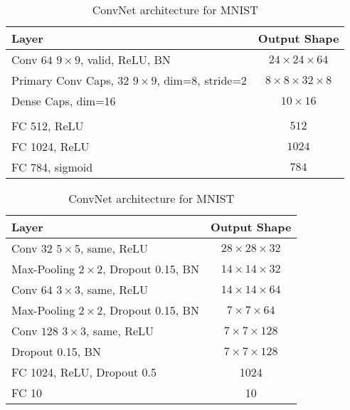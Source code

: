 \begin{table}
	\centering
	
	\begin{tabular}{lc}
		\toprule 
		Layer	&  Output Shape \\ 
		\midrule 
		Conv $64$ $9\times9$, valid, ReLU, BN & $24\times24\times64$ \\ 
		\midrule 
		Primary Conv Caps, $32$ $9\times9$, dim=$8$, stride=2	&  $8\times8\times32\times8$ \\ 
		\midrule 
		Dense Caps, dim=16	& $10\times16$ \\ 
		\midrule 
		& \\
		\midrule
		FC 512, ReLU	& $512$ \\
		\midrule
		FC 1024, ReLU	& $1024$ \\
		\midrule
		FC 784, sigmoid	& $784$ \\
		\bottomrule
	\end{tabular} 
	\caption{CapsNet architecture for MNIST}
	\label{tab:capsnet:mnist}

	\vspace{0.75cm}
	
	\begin{tabular}{lc}
		\toprule 
		Layer	&  Output Shape \\ 
		\midrule 
		Conv $32$ $5\times5$, same,	ReLU & $28\times28\times32$ \\ 
		\midrule 
		Max-Pooling $2\times2$, Dropout 0.15, BN	&  $14\times14\times32$ \\ 
		\midrule 
		Conv $64$ $3\times3$, same, ReLU	& $14\times14\times64$ \\ 
		\midrule 
		Max-Pooling $2\times2$, Dropout 0.15, BN	& $7\times7\times64$ \\
		\midrule
		Conv $128$ $3\times3$, same, ReLU	& $7\times7\times128$ \\
		\midrule
		Dropout 0.15, BN	& $7\times7\times128$ \\
		\midrule
		FC 1024, ReLU, Dropout 0.5 & 1024 \\
		\midrule
		FC 10 & 10\\
		\bottomrule
	\end{tabular} 
	\caption{ConvNet architecture for MNIST}
	\label{tab:convnet:mnist}
\end{table}


